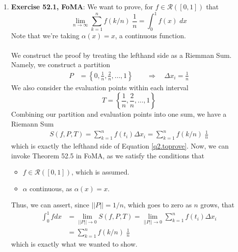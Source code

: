 \documentclass[12pt]{article}
\theoremstyle{plain}
\theoremstyle{definition}
\theoremstyle{remark}
\begin{document}
\begin{enumerate}
\newpage
\item \textbf{Exercise 52.1, FoMA}: We want to prove, for $f \in \mathscr{R}([0,1])$ that
\begin{equation}
    \label{q2.toprove}
    \lim_{n\rightarrow\infty} \sum^n_{k=1} f(k/n)\;
        \frac{1}{n} = \int^1_0 f(x) \; dx
\end{equation}
Note that we're taking $\alpha(x) = x$, a continuous function.
\\
\\
We construct the proof by treating the lefthand side as a Riemman Sum. Namely, we construct a partition
\begin{align*}
    P &= \left\{0, \frac{1}{n}, \frac{2}{n}, \ldots, 1\right\} 
    \qquad 
    \Rightarrow \quad \Delta x_i = \frac{1}{n}
\end{align*}
We also consider the evaluation points within each interval
\begin{equation}
    T = \left\{\frac{1}{n}, \frac{2}{n}, \ldots, 1\right\} 
\end{equation}
Combining our partition and evaluation points into one sum, we have a Riemann Sum
\begin{align*}
    S(f,P,T) = \sum^n_{k=1} f(t_i) \Delta x_i = 
        \sum^n_{k=1} f(k/n)\;
        \frac{1}{n}
\end{align*}
which is exactly the lefthand side of Equation \ref{q2.toprove}. Now, we can invoke Theorem 52.5 in FoMA, as we satisfy the conditions that
\begin{itemize}
    \item $f \in \mathscr{R}([0,1])$, which is assumed. 
    \item $\alpha$ continuous, as $\alpha(x)=x$.
\end{itemize}
Thus, we can assert, since $||P|| = 1/n$, which goes to zero as $n$ grows, that
\begin{align*}
    \int^1_0 f dx &= \lim_{||P||\rightarrow 0} S(f,P,T) 
    = \lim_{||P||\rightarrow 0} \sum^n_{k=1} f(t_i) \Delta x_i\\
    &= \sum^n_{k=1} f(k/n)\; \frac{1}{n}
\end{align*}
which is exactly what we wanted to show.


\end{enumerate}
\end{document}
